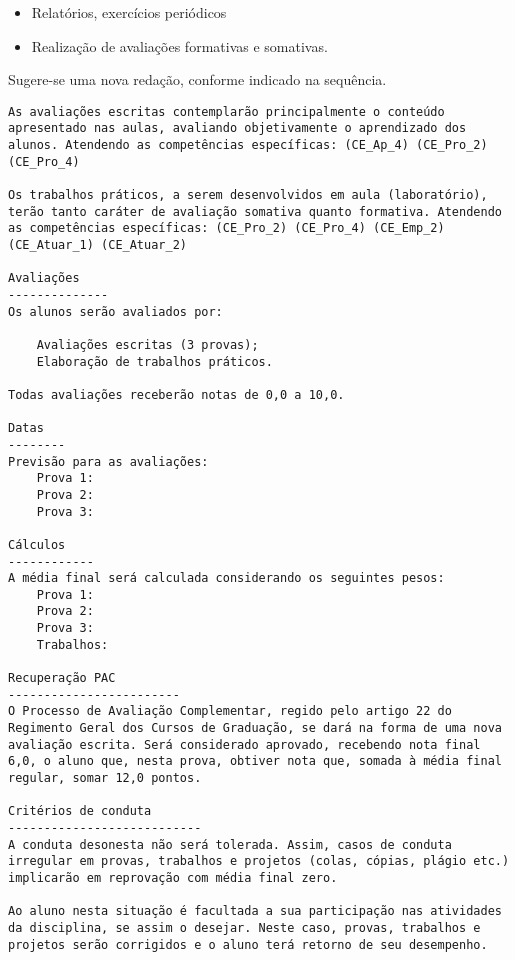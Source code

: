 \documentclass[12pt, oneside]{book}
\begin{document}
\begin{itemize}
    \item Relatórios, exercícios periódicos
    \item Realização de avaliações formativas e somativas.
\end{itemize}

Sugere-se uma nova redação, conforme indicado na sequência.

\begin{lstlisting}
As avaliações escritas contemplarão principalmente o conteúdo apresentado nas aulas, avaliando objetivamente o aprendizado dos alunos. Atendendo as competências específicas: (CE_Ap_4) (CE_Pro_2) (CE_Pro_4)

Os trabalhos práticos, a serem desenvolvidos em aula (laboratório), terão tanto caráter de avaliação somativa quanto formativa. Atendendo as competências específicas: (CE_Pro_2) (CE_Pro_4) (CE_Emp_2) (CE_Atuar_1) (CE_Atuar_2)

Avaliações
--------------
Os alunos serão avaliados por:

    Avaliações escritas (3 provas);
    Elaboração de trabalhos práticos.

Todas avaliações receberão notas de 0,0 a 10,0.

Datas
--------
Previsão para as avaliações:
    Prova 1: 
    Prova 2: 
    Prova 3: 

Cálculos
------------
A média final será calculada considerando os seguintes pesos:
    Prova 1: 
    Prova 2: 
    Prova 3: 
    Trabalhos: 

Recuperação PAC
------------------------
O Processo de Avaliação Complementar, regido pelo artigo 22 do Regimento Geral dos Cursos de Graduação, se dará na forma de uma nova avaliação escrita. Será considerado aprovado, recebendo nota final 6,0, o aluno que, nesta prova, obtiver nota que, somada à média final regular, somar 12,0 pontos.

Critérios de conduta
---------------------------
A conduta desonesta não será tolerada. Assim, casos de conduta irregular em provas, trabalhos e projetos (colas, cópias, plágio etc.) implicarão em reprovação com média final zero.

Ao aluno nesta situação é facultada a sua participação nas atividades da disciplina, se assim o desejar. Neste caso, provas, trabalhos e projetos serão corrigidos e o aluno terá retorno de seu desempenho.
\end{lstlisting}


\appendix
\RenewDocumentCommand{\thesection}{}{}  %
\end{document}
